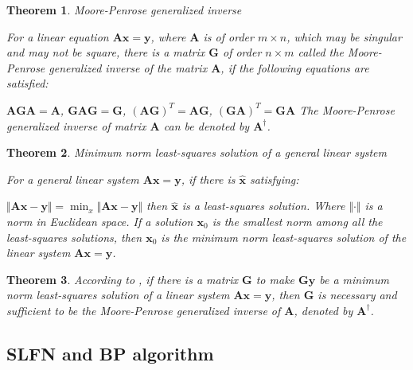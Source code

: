 \documentclass[a4paper, 14pt]{extarticle}
\newtheorem{theorem}{Theorem}
\begin{document}
\begin{theorem}
Moore-Penrose generalized inverse\cite{banerjee1973generalized}\cite{serre2010matrices}
\par For a linear equation \(\mathbf{Ax} = \mathbf{y}\), where \(\mathbf{A}\) is of order  \(m\times n \), which may be singular and may not be square, there is a matrix \(\mathbf{G}\) of order \(n\times m \) called the Moore-Penrose generalized inverse of the matrix \(\mathbf{A}\), if the following equations are satisfied:\newline \par  \(\mathbf{AGA} = \mathbf{A}\), \(\mathbf{GAG} = \mathbf{G}\), \(\mathbf{(AG)}^T = \mathbf{AG}\), \(\mathbf{(GA)}^T = \mathbf{GA}\)
\newline\newline The Moore-Penrose generalized inverse of matrix \(\mathbf{A}\) can be denoted by \(\mathbf{A}^\dagger\). 
\end{theorem}
\begin{theorem}
Minimum norm least-squares solution of a general linear system\cite{G.B.Huang-ICNN}
\par For a general linear system \(\mathbf{Ax} = \mathbf{y}\), if there is \(\hat{\mathbf{x}}\) satisfying:
\newline \par \(\Vert\mathbf{A\hat{x}}-\mathbf{y}\Vert =  \min_{x}\Vert\mathbf{Ax}-\mathbf{y}\Vert\)
\newline\newline
then \(\hat{\mathbf{x}}\) is a least-squares solution. Where \(\Vert\cdot\Vert\) is a norm in Euclidean space. If a solution \(\mathbf{x}_0\) is the smallest norm among all the least-squares solutions, then \(\mathbf{x}_0\) is the minimum norm least-squares solution of the linear system \(\mathbf{Ax} = \mathbf{y}\). 
\end{theorem}
\begin{theorem}
According to \cite{G.B.Huang-ICNN}\cite{serre2010matrices}, if there is a matrix \(\mathbf{G}\) to make \(\mathbf{Gy}\) be a minimum norm least-squares solution of a linear system \(\mathbf{Ax} = \mathbf{y}\), then \(\mathbf{G}\) is necessary and sufficient to be the Moore-Penrose generalized inverse of \(\mathbf{A}\), denoted by \(\mathbf{A}^\dagger\).   
\end{theorem}
\subsection{SLFN and BP algorithm}
\end{document}
